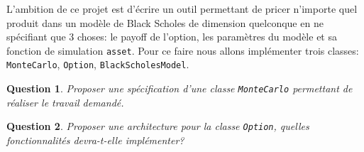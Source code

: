 \documentclass[a4paper,11pt]{article}
\def\var#1{{\tt #1}}
\newtheorem{question}{Question}
\begin{document}



L'ambition de ce projet est d'écrire un outil permettant de pricer n'importe quel produit dans un modèle de Black Scholes de dimension quelconque en ne spécifiant que 3 choses: le payoff de l'option, les paramètres du modèle et sa fonction de simulation \texttt{asset}. Pour ce faire nous allons implémenter trois classes: \verb!MonteCarlo!, \verb!Option!, \verb!BlackScholesModel!.

\begin{question}
  Proposer une spécification d'une classe \verb!MonteCarlo! permettant de réaliser le travail demandé.
\end{question}

\begin{question}
  Proposer une architecture pour la classe \verb!Option!, quelles fonctionnalités devra-t-elle implémenter?
\end{question}
\end{document}
